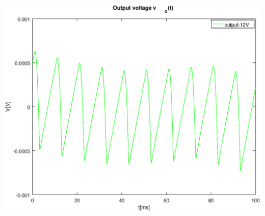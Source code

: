 \hspace{1mm}
\begin{minipage}[c]{0.50\linewidth}
\includegraphics[width=1\linewidth]{v12.eps}
\end{minipage}
